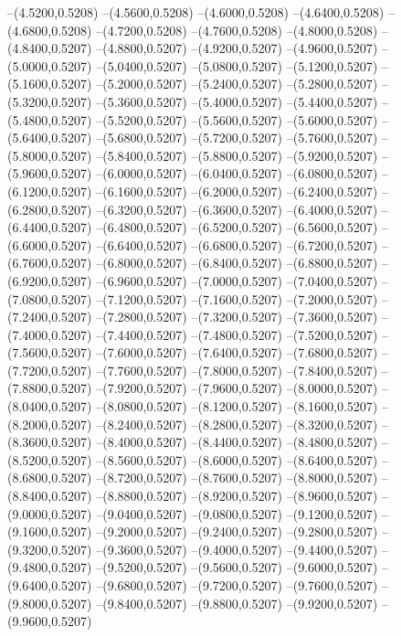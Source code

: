 {	--(4.5200,0.5208)
	--(4.5600,0.5208)
	--(4.6000,0.5208)
	--(4.6400,0.5208)
	--(4.6800,0.5208)
	--(4.7200,0.5208)
	--(4.7600,0.5208)
	--(4.8000,0.5208)
	--(4.8400,0.5207)
	--(4.8800,0.5207)
	--(4.9200,0.5207)
	--(4.9600,0.5207)
	--(5.0000,0.5207)
	--(5.0400,0.5207)
	--(5.0800,0.5207)
	--(5.1200,0.5207)
	--(5.1600,0.5207)
	--(5.2000,0.5207)
	--(5.2400,0.5207)
	--(5.2800,0.5207)
	--(5.3200,0.5207)
	--(5.3600,0.5207)
	--(5.4000,0.5207)
	--(5.4400,0.5207)
	--(5.4800,0.5207)
	--(5.5200,0.5207)
	--(5.5600,0.5207)
	--(5.6000,0.5207)
	--(5.6400,0.5207)
	--(5.6800,0.5207)
	--(5.7200,0.5207)
	--(5.7600,0.5207)
	--(5.8000,0.5207)
	--(5.8400,0.5207)
	--(5.8800,0.5207)
	--(5.9200,0.5207)
	--(5.9600,0.5207)
	--(6.0000,0.5207)
	--(6.0400,0.5207)
	--(6.0800,0.5207)
	--(6.1200,0.5207)
	--(6.1600,0.5207)
	--(6.2000,0.5207)
	--(6.2400,0.5207)
	--(6.2800,0.5207)
	--(6.3200,0.5207)
	--(6.3600,0.5207)
	--(6.4000,0.5207)
	--(6.4400,0.5207)
	--(6.4800,0.5207)
	--(6.5200,0.5207)
	--(6.5600,0.5207)
	--(6.6000,0.5207)
	--(6.6400,0.5207)
	--(6.6800,0.5207)
	--(6.7200,0.5207)
	--(6.7600,0.5207)
	--(6.8000,0.5207)
	--(6.8400,0.5207)
	--(6.8800,0.5207)
	--(6.9200,0.5207)
	--(6.9600,0.5207)
	--(7.0000,0.5207)
	--(7.0400,0.5207)
	--(7.0800,0.5207)
	--(7.1200,0.5207)
	--(7.1600,0.5207)
	--(7.2000,0.5207)
	--(7.2400,0.5207)
	--(7.2800,0.5207)
	--(7.3200,0.5207)
	--(7.3600,0.5207)
	--(7.4000,0.5207)
	--(7.4400,0.5207)
	--(7.4800,0.5207)
	--(7.5200,0.5207)
	--(7.5600,0.5207)
	--(7.6000,0.5207)
	--(7.6400,0.5207)
	--(7.6800,0.5207)
	--(7.7200,0.5207)
	--(7.7600,0.5207)
	--(7.8000,0.5207)
	--(7.8400,0.5207)
	--(7.8800,0.5207)
	--(7.9200,0.5207)
	--(7.9600,0.5207)
	--(8.0000,0.5207)
	--(8.0400,0.5207)
	--(8.0800,0.5207)
	--(8.1200,0.5207)
	--(8.1600,0.5207)
	--(8.2000,0.5207)
	--(8.2400,0.5207)
	--(8.2800,0.5207)
	--(8.3200,0.5207)
	--(8.3600,0.5207)
	--(8.4000,0.5207)
	--(8.4400,0.5207)
	--(8.4800,0.5207)
	--(8.5200,0.5207)
	--(8.5600,0.5207)
	--(8.6000,0.5207)
	--(8.6400,0.5207)
	--(8.6800,0.5207)
	--(8.7200,0.5207)
	--(8.7600,0.5207)
	--(8.8000,0.5207)
	--(8.8400,0.5207)
	--(8.8800,0.5207)
	--(8.9200,0.5207)
	--(8.9600,0.5207)
	--(9.0000,0.5207)
	--(9.0400,0.5207)
	--(9.0800,0.5207)
	--(9.1200,0.5207)
	--(9.1600,0.5207)
	--(9.2000,0.5207)
	--(9.2400,0.5207)
	--(9.2800,0.5207)
	--(9.3200,0.5207)
	--(9.3600,0.5207)
	--(9.4000,0.5207)
	--(9.4400,0.5207)
	--(9.4800,0.5207)
	--(9.5200,0.5207)
	--(9.5600,0.5207)
	--(9.6000,0.5207)
	--(9.6400,0.5207)
	--(9.6800,0.5207)
	--(9.7200,0.5207)
	--(9.7600,0.5207)
	--(9.8000,0.5207)
	--(9.8400,0.5207)
	--(9.8800,0.5207)
	--(9.9200,0.5207)
	--(9.9600,0.5207)
}
